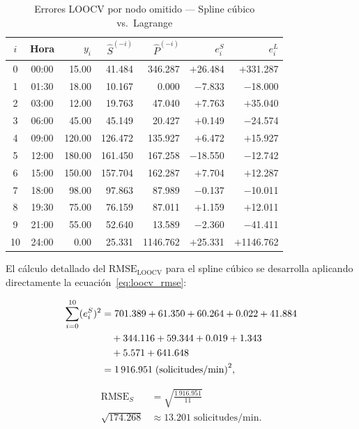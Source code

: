\documentclass[conference]{IEEEtran}
\begin{document}
\begin{table}[h]
\caption{Errores LOOCV por nodo omitido — Spline cúbico vs.\ Lagrange}
\label{tab:loocv}
\centering
\begin{tabular}{ccrrrrr}
\toprule
$i$ & Hora & $y_i$ & $\hat{S}^{(-i)}$ & $\hat{P}^{(-i)}$
    & $e_i^{S}$ & $e_i^{L}$ \\
\midrule
 0 & 00:00 &  15.00 &  41.484 & 346.287 & $+$26.484 & $+$331.287 \\
 1 & 01:30 &  18.00 &  10.167 &   0.000 & $-$7.833  & $-$18.000  \\
 2 & 03:00 &  12.00 &  19.763 &  47.040 & $+$7.763  & $+$35.040  \\
 3 & 06:00 &  45.00 &  45.149 &  20.427 & $+$0.149  & $-$24.574  \\
 4 & 09:00 & 120.00 & 126.472 & 135.927 & $+$6.472  & $+$15.927  \\
 5 & 12:00 & 180.00 & 161.450 & 167.258 & $-$18.550 & $-$12.742  \\
 6 & 15:00 & 150.00 & 157.704 & 162.287 & $+$7.704  & $+$12.287  \\
 7 & 18:00 &  98.00 &  97.863 &  87.989 & $-$0.137  & $-$10.011  \\
 8 & 19:30 &  75.00 &  76.159 &  87.011 & $+$1.159  & $+$12.011  \\
 9 & 21:00 &  55.00 &  52.640 &  13.589 & $-$2.360  & $-$41.411  \\
10 & 24:00 &   0.00 &  25.331 & 1146.762& $+$25.331 & $+$1146.762\\
\bottomrule
\end{tabular}
\end{table}

El cálculo detallado del $\mathrm{RMSE}_{\mathrm{LOOCV}}$ para el
spline cúbico se desarrolla aplicando directamente
la ecuación~\eqref{eq:loocv_rmse}:

\begin{align}
\sum_{i=0}^{10} (e_i^{S})^2
  &= 701.389 + 61.350 + 60.264 + 0.022 + 41.884 \notag\\
  &\quad + 344.116 + 59.344 + 0.019 + 1.343 \notag\\
  &\quad + 5.571 + 641.648 \notag\\
  &= 1\,916.951 \; \text{(solicitudes/min)}^2,
\label{eq:suma_cuadrados_spline}
\end{align}

\begin{align}
\mathrm{RMSE}_{S}
  &= \sqrt{\frac{1\,916.951}{11}} \\
  \sqrt{174.268} &\approx \mathbf{13.201} \; \text{solicitudes/min}.
\label{eq:rmse_spline_final}
\end{align}
\end{document}

